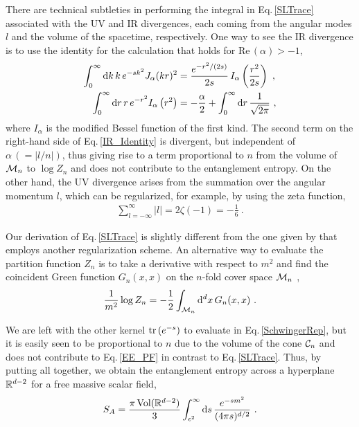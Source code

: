 There are technical subtleties in performing the integral in Eq.\,\eqref{SLTrace} associated with the UV and IR divergences, each coming from the angular modes $l$ and the volume of the spacetime, respectively. 
One way to see the IR divergence is to use the identity for the calculation that holds for $\text{Re} \,(\alpha) > -1$,
\begin{align}
\int_0^\infty \d k\, k\, e^{-s k^2} J_\alpha (kr)^2 &= \frac{e^{- r^2/(2s)}}{2s}\, I_\alpha \left( \frac{r^2}{2s}\right) \ ,\\
\int_0^\infty \d r\, r \,e^{-r^2} I_\alpha \left( r^2\right) &= - \frac{\alpha}{2} + \int_0^\infty \d r \,\frac{1}{\sqrt{2\pi}} \ ,\label{IR_Identity}
\end{align}
where $I_\alpha$ is the modified Bessel function of the first kind.
The second term on the right-hand side of Eq.\,\eqref{IR_Identity} is divergent, but independent of $\alpha\, (=|l/n|)$, thus giving rise to a term proportional to $n$ from the volume of ${\cal M}_n$ to $\log Z_n$ and does not contribute to the entanglement entropy.
On the other hand, the UV divergence arises from the summation over the angular momentum $l$, which can be regularized, for example, by using the zeta function,
\begin{align}
\sum_{l=-\infty}^\infty |l| = 2\zeta(-1) =  - \frac{1}{6} \ .
\end{align}

Our derivation of Eq.\,\eqref{SLTrace} is slightly different from the one given by \textcite{Kabat:1995eq} that employs another regularization scheme.
An alternative way to evaluate the partition function $Z_n$ is to take a derivative with respect to $m^2$ and find the coincident Green function $G_n(x, x)$ on the $n$-fold cover space ${\cal M}_n$ \cite{Calabrese:2004eu},
\begin{align}
\frac{1}{m^2} \log Z_n = - \frac{1}{2}\int_{{\cal M}_n} \mathrm{d}^dx\, G_n(x, x) \ .
\end{align}


We are left with the other kernel ${\rm tr} \,(e^{-s})$ to evaluate in Eq.\,\eqref{SchwingerRep}, but it is easily seen to be proportional to $n$ due to the volume of the cone ${\cal C}_n$ and does not contribute to Eq.\,\eqref{EE_PF} in contrast to Eq.\,\eqref{SLTrace}.
Thus, by putting all together, we obtain the entanglement entropy across a hyperplane $\mathbb{R}^{d-2}$ for a free massive scalar field,
\begin{align}
	S_A = \frac{\pi\,\text{Vol}(\mathbb{R}^{d-2})}{3} \int_{\epsilon^2}^\infty \mathrm{d} s \, \frac{e^{-s m^2}}{(4\pi s)^{d/2}}  \ .
\end{align}

